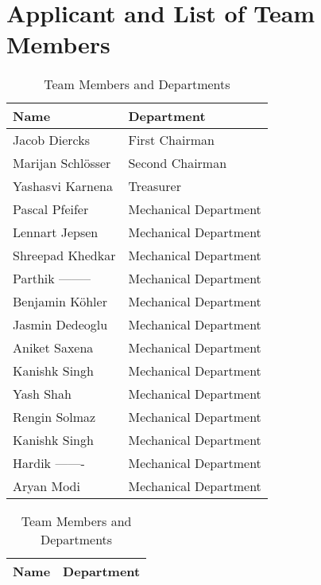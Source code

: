 \section{Applicant and List of Team Members}
\begin{table}[H]
\centering
\begin{minipage}{0.45\textwidth}
\centering
\begin{tabular}{|l|l|}
\hline
\textbf{Name}           & \textbf{Department}        \\ \hline
Jacob Diercks            & First Chairman             \\ \hline
Marijan Schlösser       & Second Chairman            \\ \hline
Yashasvi Karnena        & Treasurer                  \\ \hline
Pascal Pfeifer          & Mechanical Department      \\ \hline
Lennart Jepsen          & Mechanical Department      \\ \hline
Shreepad Khedkar        & Mechanical Department      \\ \hline
Parthik --------        & Mechanical Department      \\ \hline
Benjamin Köhler         & Mechanical Department      \\ \hline
Jasmin Dedeoglu         & Mechanical Department      \\ \hline
Aniket Saxena           & Mechanical Department      \\ \hline
Kanishk Singh           & Mechanical Department      \\ \hline
Yash Shah               & Mechanical Department      \\ \hline
Rengin Solmaz           & Mechanical Department      \\ \hline
Kanishk Singh         & Mechanical Department      \\ \hline
Hardik -------             & Mechanical Department      \\ \hline
Aryan Modi              & Mechanical Department      \\ \hline
\end{tabular}
\caption{Team Members and Departments}
\label{tab:left}
\end{minipage}
\hfill
\begin{minipage}{0.45\textwidth}
\centering
\begin{tabular}{|l|l|}
\hline
\textbf{Name}           & \textbf{Department}        \\ \hline

\end{tabular}
\end{minipage}
\end{table}
